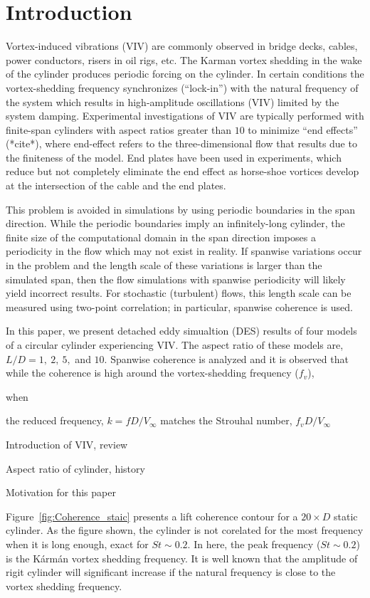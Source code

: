 \documentclass[12pt,preprint]{elsarticle}
\begin{document}
\section{Introduction}
\label{sec:intro}
%
Vortex-induced vibrations (VIV) are commonly observed in bridge decks, cables,
power conductors, risers in oil rigs, etc. The Karman vortex shedding in the
wake of the cylinder produces periodic forcing on the cylinder. In certain
conditions the vortex-shedding frequency synchronizes (``lock-in'') with the
natural frequency of the system which results in high-amplitude oscillations
(VIV) limited by the system damping. Experimental investigations of VIV are
typically performed with finite-span cylinders with aspect ratios greater than
$10$ to minimize ``end effects'' (*cite*), where end-effect refers to the
three-dimensional flow that results due to the finiteness of the model. End
plates have been used in experiments, which reduce but not completely eliminate
the end effect as horse-shoe vortices develop at the intersection of the cable
and the end plates. 

This problem is avoided in simulations by using periodic boundaries in the span
direction. While the periodic boundaries imply an infinitely-long cylinder, the
finite size of the computational domain in the span direction imposes a
periodicity in the flow which may not exist in reality. If spanwise variations
occur in the problem and the length scale of these variations is larger than
the simulated span, then the flow simulations with spanwise periodicity will
likely yield incorrect results. For stochastic (turbulent) flows, this length
scale can be measured using two-point correlation; in particular, spanwise
coherence is used.

In this paper, we present detached eddy simualtion (DES) results of four models
of a circular cylinder experiencing VIV. The aspect ratio of these models are,
$L/D=1,~2,~5,$ and $10$. Spanwise coherence is analyzed and it is observed that
while the coherence is high around the vortex-shedding frequency ($f_v$),  

when 

the reduced frequency, $k=fD/V_\infty$ matches
the Strouhal number, $f_v D/V_\infty$


Introduction of VIV, review

Aspect ratio of cylinder, history

Motivation for this paper

Figure~\ref{fig:Coherence_staic} presents a lift coherence contour for a
$20\times D$ static cylinder. As the figure shown, the cylinder is not
corelated for the most frequency when it is long enough, exact for $St\sim
0.2$. In here, the peak frequency ($St\sim 0.2$) is the Kármán vortex
shedding frequency. It is well known that the amplitude of rigit cylinder will
significant increase if the natural frequency is close to the vortex shedding
frequency. 
\end{document}
